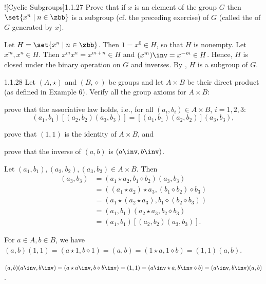 \begin{exercise}![Cyclic Subgroups]{1.1.27}
    Prove that if $x$ is an element of the group $G$ then $\set{x^n \mid n \in \zbb}$ is a subgroup (cf. the preceding exercise) of $G$ (called the  of $G$ generated by $x$).
\end{exercise}

\begin{sol}
    Let $H = \set{x^n \mid n \in \zbb}$.
    Then $1 = x^0 \in H$, so that $H$ is nonempty.
    Let $x^m, x^n \in H$.
    Then $x^m x^n = x^{m+n} \in H$ and $(x^m)\inv = x^{-m} \in H$.
    Hence, $H$ is closed under the binary operation on $G$ and inverses.
    By , $H$ is a subgroup of $G$.
\end{sol}

\begin{exercise}{1.1.28}
    Let $(A, \star)$ and $(B, \diamond)$ be groups and let $A \times B$ be their direct product (as defined in Example 6).
	Verify all the group axioms for $A \times B$:
    \begin{subexercises}
        \item prove that the associative law holds, i.e., for all $(a_i, b_i) \in A \times B$, $i = 1, 2, 3$:
        \[
            (a_1, b_1)[(a_2, b_2)(a_3, b_3)] = [(a_1, b_1)(a_2, b_2)](a_3, b_3),
        \]
        \item prove that $(1, 1)$ is the identity of $A \times B$, and
        \item prove that the inverse of $(a, b)$ is $(a\inv, b\inv)$.
    \end{subexercises}
\end{exercise}

\begin{solenum}
    \item Let $(a_1, b_1), (a_2, b_2), (a_3, b_3) \in A \times B$.
	Then
    \begin{align*}
        [(a_1, b_1)(a_2, b_2)](a_3, b_3) &= (a_1 \star a_2, b_1 \diamond b_2)(a_3, b_3) \\
        &= ((a_1 \star a_2) \star a_3, (b_1 \diamond b_2) \diamond b_3) \\
        &= (a_1 \star (a_2 \star a_3), b_1 \diamond (b_2 \diamond b_3)) \\
        &= (a_1, b_1)(a_2 \star a_3, b_2 \diamond b_3) \\
        &= (a_1, b_1)[(a_2, b_2)(a_3, b_3)].
    \end{align*}
    \item For $a \in A, b \in B$, we have $(a, b)(1, 1) = (a \star 1, b \diamond 1) = (a, b) = (1 \star a, 1 \diamond b) = (1, 1)(a, b)$.
    \item $(a, b)(a\inv, b\inv) = (a \star a\inv, b \diamond b\inv) = (1, 1) = (a\inv \star a, b\inv \diamond b) = (a\inv, b\inv)(a, b)$.
\end{solenum}

